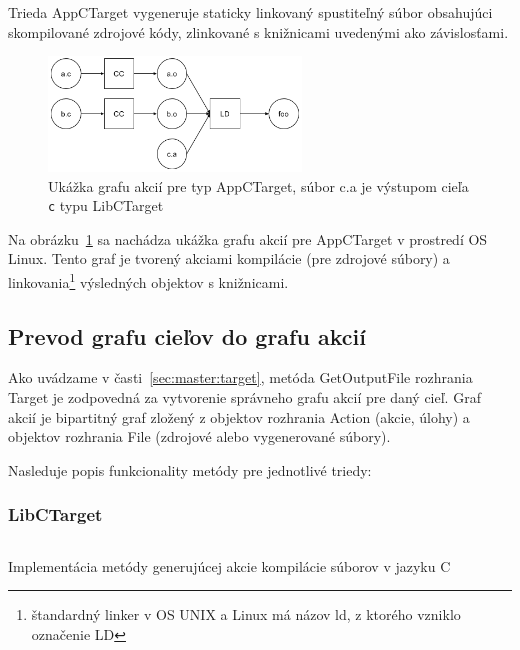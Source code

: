 Trieda AppCTarget vygeneruje staticky linkovaný spustiteľný súbor obsahujúci
skompilované zdrojové kódy, zlinkované s knižnicami uvedenými ako závislosťami.

\begin{figure}[h]
  \centerline{\includegraphics[width=0.6\textwidth]{images/appctarget}}
  \caption[Graf akcií pre typ AppCTarget]{Ukážka grafu akcií pre typ AppCTarget,
  súbor c.a je výstupom cieľa \texttt{c} typu LibCTarget}
  \label{img:appctarget}
\end{figure}

Na obrázku~\ref{img:appctarget} sa nachádza ukážka grafu akcií pre AppCTarget
v prostredí OS Linux. Tento graf je tvorený akciami kompilácie (pre zdrojové
súbory) a linkovania\footnote{štandardný linker v OS UNIX a Linux má názov ld,
z ktorého vzniklo označenie LD} výsledných objektov s knižnicami.

\subsection{Prevod grafu cie\v{l}ov do grafu akci\'{i}}
\label{sec:master:target2action}

Ako uvádzame v časti~\ref{sec:master:target}, metóda GetOutputFile rozhrania Target
je zodpovedná za vytvorenie správneho grafu akcií pre daný cieľ. Graf akcií je
bipartitný graf zložený z objektov rozhrania Action (akcie, úlohy) a objektov
rozhrania File (zdrojové alebo vygenerované súbory).

Nasleduje popis funkcionality metódy pre jednotlivé triedy:

\subsubsection{LibCTarget}

\begin{listing}[h]
  \inputminted[frame=lines,framesep=2mm,linenos,fontsize=\scriptsize,firstline=23,lastline=61]{go}{/home/pepol/src/imterra/forge/client/actions/util.go}
  \caption[Pomocná metóda MakeCObjects]{Implementácia metódy generujúcej akcie
  kompilácie súborov v jazyku C}
  \label{lst:target2action:makecobjs}
\end{listing}

